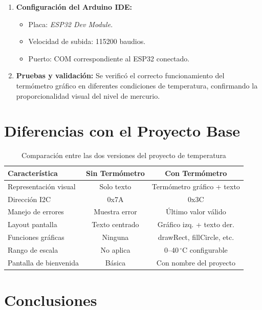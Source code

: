 \documentclass[12pt,a4paper]{article}
\begin{document}
\begin{enumerate}
    \item \textbf{Configuración del Arduino IDE:}
    \begin{itemize}
        \item Placa: \textit{ESP32 Dev Module}.
        \item Velocidad de subida: 115200 baudios.
        \item Puerto: COM correspondiente al ESP32 conectado.
    \end{itemize}
    
    \item \textbf{Pruebas y validación:} Se verificó el correcto funcionamiento del termómetro gráfico en diferentes condiciones de temperatura, confirmando la proporcionalidad visual del nivel de mercurio.
\end{enumerate}

\section{Diferencias con el Proyecto Base}

\begin{table}[H]
\centering
\begin{tabular}{lcc}
\toprule
\textbf{Característica} & \textbf{Sin Termómetro} & \textbf{Con Termómetro} \\
\midrule
Representación visual & Solo texto & Termómetro gráfico + texto \\
Dirección I2C & 0x7A & 0x3C \\
Manejo de errores & Muestra error & Último valor válido \\
Layout pantalla & Texto centrado & Gráfico izq. + texto der. \\
Funciones gráficas & Ninguna & drawRect, fillCircle, etc. \\
Rango de escala & No aplica & 0--40$\,^\circ$C configurable \\
Pantalla de bienvenida & Básica & Con nombre del proyecto \\
\bottomrule
\end{tabular}
\caption{Comparación entre las dos versiones del proyecto de temperatura}
\end{table}

\section{Conclusiones}
\end{document}
